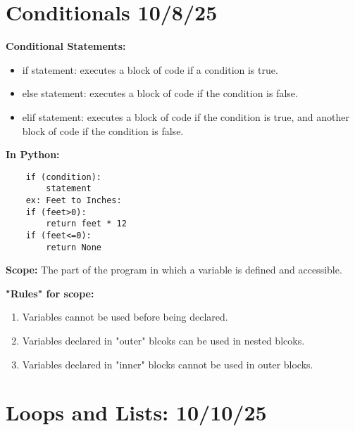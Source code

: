 \documentclass[11pt]{article}
\begin{document}
\section{Conditionals 10/8/25}
\textbf{Conditional Statements:}
\begin{itemize}
    \item if statement: executes a block of code if a condition is true.
    \item else statement: executes a block of code if the condition is false.
    \item elif statement: executes a block of code if the condition is true, and another block of code if the condition is false.
\end{itemize}
\textbf{In Python:}
\begin{verbatim}
    if (condition):
        statement
    ex: Feet to Inches:
    if (feet>0):
        return feet * 12
    if (feet<=0):
        return None
\end{verbatim}
\textbf{Scope:} The part of the program in which a variable is defined and accessible. 
\begin{center}
\textbf{"Rules" for scope:}
\end{center}
\begin{enumerate}
    \item Variables cannot be used before being declared.
    \item Variables declared in "outer" blcoks can be used in nested blcoks.
    \item Variables declared in "inner" blocks cannot be used in outer blocks.
\end{enumerate}

\section{Loops and Lists: 10/10/25}
\end{document}
